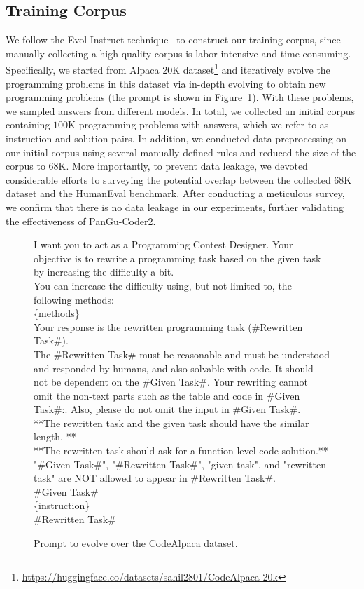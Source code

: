 \documentclass{article}
\newcommand{\pgcoder}{PanGu-Coder2\xspace}
\begin{document}
\subsection{Training Corpus}\label{training_corpus}

We follow the Evol-Instruct technique~\cite{wizardlm,wizardcoder} to construct our training corpus, since manually collecting a high-quality corpus is labor-intensive and time-consuming.
Specifically, we started from Alpaca 20K dataset\footnote{\url{https://huggingface.co/datasets/sahil2801/CodeAlpaca-20k}} and iteratively evolve the programming problems in this dataset via in-depth evolving to obtain new programming problems (the prompt is shown in Figure~\ref{fig:prompt}). With these problems, we sampled answers from different models. In total, we collected an initial corpus containing $100$K programming problems with answers, which we refer to as instruction and solution pairs. In addition, we conducted data preprocessing on our initial corpus using several manually-defined rules and reduced the size of the corpus to $68$K. 
More importantly, to prevent data leakage, we devoted considerable efforts to surveying the potential overlap between the collected $68$K dataset and the HumanEval benchmark. After conducting a meticulous survey, we confirm that there is no data leakage in our experiments, further validating the effectiveness of \pgcoder.

\begin{figure}
    \centering
\begin{tcolorbox}[left=2pt,right=2pt,top=0pt,bottom=0pt]
I want you to act as a Programming Contest Designer. Your objective is to rewrite a programming task based on the given task by increasing the difficulty a bit.\\
You can increase the difficulty using, but not limited to, the following methods:\\
\{methods\} \\

Your response is the rewritten programming task (\#Rewritten Task\#).\\
The \#Rewritten Task\# must be reasonable and must be understood and responded by humans, and also solvable with code. It should not be dependent on the \#Given Task\#. Your rewriting cannot omit the non-text parts such as the table and code in \#Given Task\#:. Also, please do not omit the input in \#Given Task\#.\\
**The rewritten task and the given task should have the similar length. **\\
**The rewritten task should ask for a function-level code solution.**\\
"\#Given Task\#", "\#Rewritten Task\#", "given task", and "rewritten task" are NOT allowed to appear in \#Rewritten Task\#. \\
\#Given Task\# \\
\{instruction\} \\
\#Rewritten Task\#
\end{tcolorbox}
\caption{Prompt to evolve over the CodeAlpaca dataset.}
\label{fig:prompt}
\end{figure}
\end{document}
